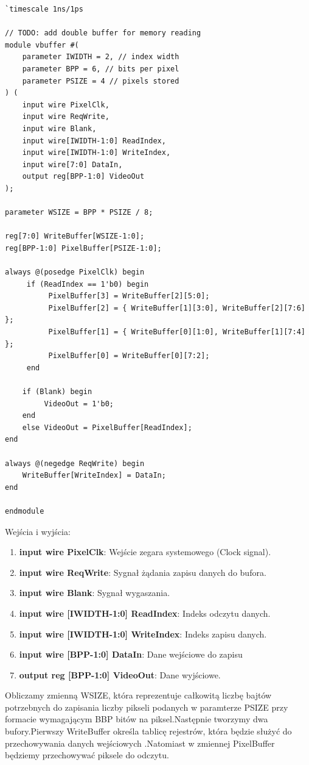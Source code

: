 \documentclass[12pt, a4paper]{article}
\begin{document}
\begin{lstlisting}[style=prettyverilog,caption={Moduł vbuffer.v}]
`timescale 1ns/1ps

// TODO: add double buffer for memory reading
module vbuffer #(
    parameter IWIDTH = 2, // index width
    parameter BPP = 6, // bits per pixel
    parameter PSIZE = 4 // pixels stored
) (
    input wire PixelClk,
    input wire ReqWrite,
    input wire Blank,
    input wire[IWIDTH-1:0] ReadIndex,
    input wire[IWIDTH-1:0] WriteIndex,
    input wire[7:0] DataIn,
    output reg[BPP-1:0] VideoOut
);

parameter WSIZE = BPP * PSIZE / 8;

reg[7:0] WriteBuffer[WSIZE-1:0];
reg[BPP-1:0] PixelBuffer[PSIZE-1:0];

always @(posedge PixelClk) begin
	 if (ReadIndex == 1'b0) begin
	 	  PixelBuffer[3] = WriteBuffer[2][5:0];
		  PixelBuffer[2] = { WriteBuffer[1][3:0], WriteBuffer[2][7:6] };
		  PixelBuffer[1] = { WriteBuffer[0][1:0], WriteBuffer[1][7:4] };
		  PixelBuffer[0] = WriteBuffer[0][7:2];
	 end
	 
    if (Blank) begin
	     VideoOut = 1'b0;
    end
    else VideoOut = PixelBuffer[ReadIndex];
end
    
always @(negedge ReqWrite) begin
    WriteBuffer[WriteIndex] = DataIn;
end

endmodule
\end{lstlisting}
Wejścia i wyjścia:
\begin{enumerate}
    \item \textbf{\fontsize{11}{10}\selectfont input wire PixelClk}: Wejście zegara systemowego (Clock signal).
    \item \textbf{\fontsize{11}{10}\selectfont input wire ReqWrite}: Sygnał żądania zapisu danych do bufora.
    \item \textbf{\fontsize{11}{10}\selectfont input wire Blank}: Sygnał wygaszania.
    \item \textbf{\fontsize{11}{10}\selectfont input wire [IWIDTH-1:0] ReadIndex}: Indeks odczytu danych.
    \item \textbf{\fontsize{11}{10}\selectfont input wire [IWIDTH-1:0] WriteIndex}: Indeks zapisu danych.
    \item \textbf{\fontsize{11}{10}\selectfont input wire [BPP-1:0] DataIn}: Dane wejściowe do zapisu
    \item \textbf{\fontsize{11}{10}\selectfont output reg [BPP-1:0] VideoOut}: Dane wyjściowe.
\end{enumerate}
Obliczamy zmienną WSIZE, która reprezentuje całkowitą liczbę bajtów potrzebnych do zapisania liczby pikseli podanych w paramterze PSIZE przy formacie wymagającym BBP bitów na piksel.Następnie tworzymy dwa bufory.Pierwszy  WriteBuffer określa tablicę rejestrów, która będzie służyć do przechowywania danych wejściowych .Natomiast w zmiennej PixelBuffer będziemy przechowywać piksele do odczytu.
\end{document}
